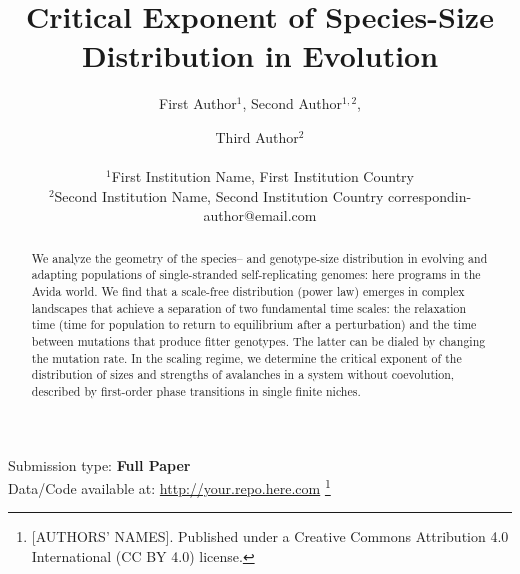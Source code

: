\documentclass[letterpaper]{article}
\title{Critical Exponent of Species-Size Distribution in Evolution}
\author{
    First Author$^{1}$,
    Second Author$^{1,2}$, \and
    Third Author$^2$ \\
    \mbox{}\\
    $^1$First Institution Name, First Institution Country \\
    $^2$Second Institution Name, Second Institution Country
    correspondin-author@email.com
} %
\newcommand\blfootnote[1]{%
  \begingroup
  \renewcommand\thefootnote{}\footnote{#1}%
  \addtocounter{footnote}{-1}%
  \endgroup
}
\begin{document}
\maketitle

\begin{abstract}
    We analyze the geometry of the species-- and genotype-size distribution in evolving and adapting populations of single-stranded self-replicating genomes: here programs in the Avida world.
    We find that a scale-free distribution (power law) emerges in complex landscapes that achieve a separation of two fundamental time scales: the relaxation time (time for population to return to equilibrium after a perturbation) and the time between mutations that produce fitter genotypes.
    The latter can be dialed by changing the mutation rate.
    In the scaling regime, we determine the critical exponent of the distribution of sizes and strengths of avalanches in a system without coevolution, described by first-order phase transitions in single finite niches.
\end{abstract}


Submission type: \textbf{Full Paper}\\

Data/Code available at: \url{http://your.repo.here.com}
\blfootnote{ [AUTHORS' NAMES]. Published under a Creative Commons Attribution 4.0 International (CC BY 4.0) license.}
\end{document}
